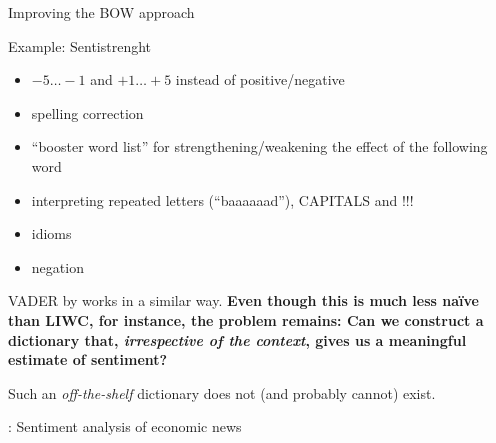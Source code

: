 \documentclass[compress]{beamer}
\begin{document}
\begin{frame}{Improving the BOW approach}
	\begin{block}{Example: Sentistrenght \parencite{Thelwall2012}}
		\begin{itemize}
			\item $-5\ldots-1$ and $+1\ldots+5$ instead of positive/negative
			\item spelling correction
			\item ``booster word list'' for strengthening/weakening the effect of the following word
			\item interpreting repeated letters (``baaaaaad''), CAPITALS and !!!
			\item idioms
			\item negation 
		\end{itemize}
	\end{block}

VADER by \cite{Hutto2014} works in a similar way.
\pause
\textbf{Even though this is much less na\"ive than LIWC, for instance, the problem remains: Can we construct a dictionary that, \emph{irrespective of the context}, gives us a meaningful estimate of sentiment? }
\end{frame}





\begin{frame}[standout]
	Such an \textit{off-the-shelf} dictionary does not (and probably cannot) exist.
\end{frame}



\begin{frame}{\cite{Boukes2020}: Sentiment analysis of economic news}
\end{frame}
\end{document}
